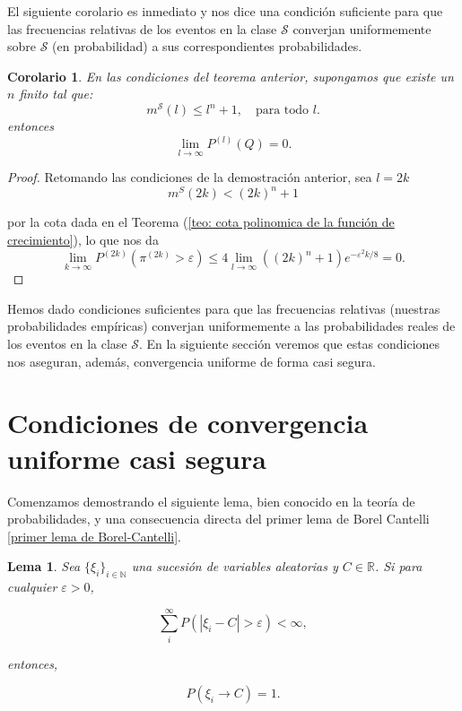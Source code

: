 \documentclass{report}
\newtheorem{lem}{Lema}[section]
\newtheorem{cor}{Corolario}[thm]
\begin{document}
El siguiente corolario es inmediato y nos dice una condición suficiente para que las frecuencias relativas de 
los eventos en la clase \( \mathcal{S} \) converjan uniformemente sobre \( \mathcal{S} \) (en probabilidad) a sus 
correspondientes probabilidades.

\begin{cor}
En las condiciones del teorema anterior, supongamos que existe un $n$ finito tal que:
\[
m^{\mathcal{S}}(l) \leq l^n + 1, \quad \text{para todo } l.
\]
entonces
\[
\lim_{l\to\infty} P^{(l)}\left(Q\right)= 0.
\]
\end{cor}

\begin{proof}

Retomando las condiciones de la demostración anterior, sea $l=2k$
\[
m^S(2k)<(2k)^n + 1
\]

por la cota dada en el Teorema (\ref{teo: cota polinomica de la función de crecimiento}), lo que nos da
\[
\lim_{k\to\infty} P^{(2k)}\left(\pi^{(2k)}>\varepsilon\right) \leq 4 \lim_{l\to\infty} ((2k)^n+1) e^{-\varepsilon^2 k / 8} = 0.
\]    
\end{proof}


\bigskip
Hemos dado condiciones suficientes para que las frecuencias relativas (nuestras probabilidades empíricas) converjan uniformemente a las 
probabilidades reales de los eventos en la clase \( \mathcal{S} \). En la siguiente sección veremos que estas condiciones nos aseguran, además, 
convergencia uniforme de forma casi segura.\newline

\section{Condiciones de convergencia uniforme casi segura}

Comenzamos demostrando el siguiente lema, bien conocido en la teoría de probabilidades, y una consecuencia directa del primer lema de Borel Cantelli \ref{primer lema de Borel-Cantelli}.

\begin{lem}\label{Aplicacion del lema de Borel-Cantelli}
    Sea $\{\xi_i\}_{i\in\mathbb{N}}$ una sucesión de variables aleatorias y $C\in\mathbb{R}$. Si para cualquier \( \varepsilon > 0 \),

    \[
    \sum_{i}^{\infty} P(|\xi_i - C| > \varepsilon) < \infty,
    \]
    
    entonces,
    
    \[
    P(\xi_i \to C) = 1.
    \]
\end{lem}
\end{document}
